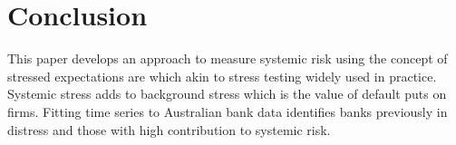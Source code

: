 \documentclass[authoryear]{elsarticle}
\begin{document}
\section{Conclusion}\label{conclude}


This paper develops an approach to measure systemic risk using the concept of stressed expectations are which akin to stress testing widely used in practice. Systemic stress adds to background stress which is the value of default puts on firms. Fitting time series to Australian bank data identifies banks previously in distress and those with high contribution to systemic risk.

\end{document}
